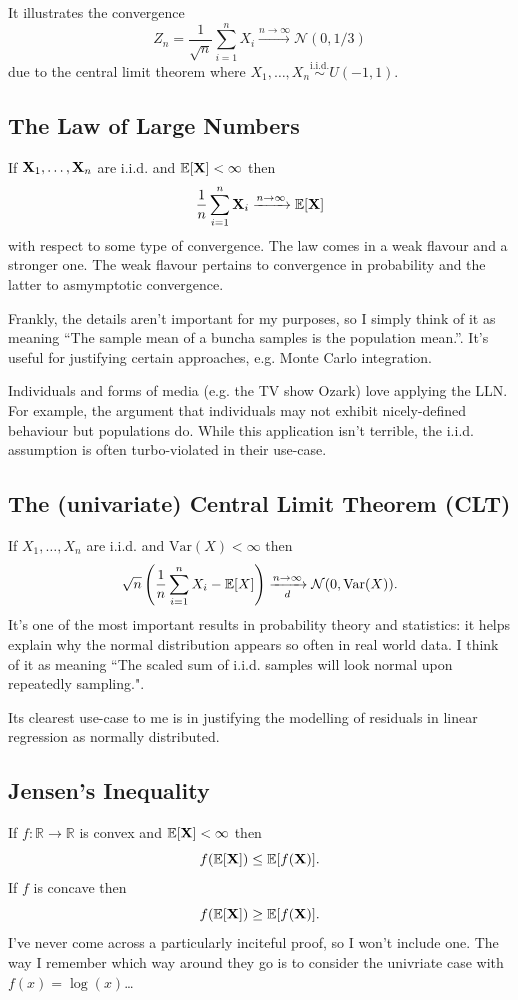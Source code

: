 \documentclass[11pt]{article}
\begin{document}
\begin{appendices}
It illustrates the convergence
$$
Z_n
=
\frac{1}{\sqrt{n}}\sum_{i=1}^n X_i
\xrightarrow{n\to\infty}
\mathcal{N}(0,1/3)
$$
due to the central limit theorem where $X_1,\dots,X_n\overset{\text{i.i.d.}}{\sim}U(-1,1)$.

\subsection{The Law of Large Numbers}
If $\mathbf{X}_1,\dots,\mathbf{X}_n$ are i.i.d. and $\mathbb{E}[\mathbf{X}]<\infty$ then
$$
\frac{1}{n}\sum_{i=1}^n\mathbf{X}_i
\xrightarrow{n\to\infty}
\mathbb{E}[\mathbf{X}]
$$
with respect to some type of convergence. The law comes in a weak flavour and a stronger one. The weak flavour pertains to convergence in probability and the latter to asmymptotic convergence.

Frankly, the details aren't important for my purposes, so I simply think of it as meaning ``The sample mean of a buncha samples is the population mean.''. It's useful for justifying certain approaches, e.g. Monte Carlo integration.

\begin{tcolorbox}[title={\centering\textbf{i.i.d. assumption}}, colback=myLightBlue, colbacktitle=myDarkBlue, colframe=myDarkBlue, coltitle=white]
    Individuals and forms of media (e.g. the TV show Ozark) love applying the LLN. For example, the argument that individuals may not exhibit nicely-defined behaviour but populations do. While this application isn't terrible, the i.i.d. assumption is often turbo-violated in their use-case.
\end{tcolorbox}

\subsection{The (univariate) Central Limit Theorem (CLT)}
If $X_1,\dots,X_n$ are i.i.d. and $\text{Var}(X)<\infty$ then
$$
\sqrt{n}\left(\frac{1}{n}\sum_{i=1}^nX_i-\mathbb{E}[X]\right)
\xrightarrow[d]{n\to\infty}
\mathcal{N}(0,\text{Var}(X)).
$$
It's one of the most important results in probability theory and statistics: it helps explain why the normal distribution appears so often in real world data. I think of it as meaning ``The scaled sum of i.i.d. samples will look normal upon repeatedly sampling.".

Its clearest use-case to me is in justifying the modelling of residuals in linear regression as normally distributed.

\subsection{Jensen's Inequality}
If $f:\mathbb{R}\to\mathbb{R}$ is convex and $\mathbb{E}[\mathbf{X}]<\infty$ then
$$
f(\mathbb{E}[\mathbf{X}])\leq\mathbb{E}[f(\mathbf{X})].
$$
If $f$ is concave then
$$
f(\mathbb{E}[\mathbf{X}])\geq\mathbb{E}[f(\mathbf{X})].
$$
I've never come across a particularly inciteful proof, so I won't include one. The way I remember which way around they go is to consider the univriate case with $f(x)=\log(x)$\dots


\end{appendices}
\end{document}
